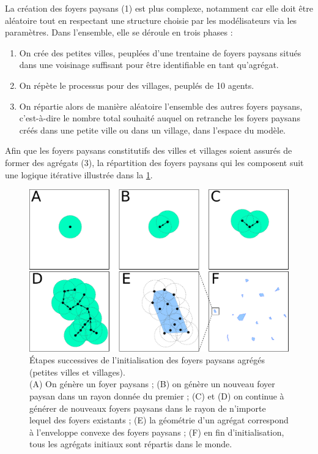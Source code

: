 La création des foyers paysans (1) est plus complexe, notamment car elle doit être aléatoire tout en respectant une structure choisie par les modélisateurs via les paramètres. Dans l'ensemble, elle se déroule en trois phases :
\begin{enumerate}
	\item On crée des \og petites villes\fg{}, peuplées d'une trentaine de foyers paysans situés dans une voisinage suffisant pour être identifiable en tant qu'agrégat.
	\item On répète le processus pour des \og villages\fg{}, peuplés de 10 agents.
	\item On répartie alors de manière aléatoire l'ensemble des autres foyers paysans, c'est-à-dire le nombre total souhaité auquel on retranche les foyers paysans créés dans une petite ville ou dans un village, dans l'espace du modèle.
\end{enumerate}
Afin que les foyers paysans constitutifs des villes et villages soient assurés de former des agrégats (3), la répartition des foyers paysans qui les composent suit une logique itérative illustrée dans la \cref{fig:init-fp}.

\begin{figure}[H]
	\centering
	\includegraphics[width=.98\linewidth]{img/init_fp.pdf}
	\caption{Étapes successives de l'initialisation des foyers paysans agrégés (petites villes et villages).\\
	(A) On génère un foyer paysans ; (B) on génère un nouveau foyer paysan dans un rayon donnée du premier ; (C) et (D) on continue à générer de nouveaux foyers paysans dans le rayon de n'importe lequel des foyers existants ; (E) la géométrie d'un agrégat correspond à l'enveloppe convexe des foyers paysans ; (F) en fin d'initialisation, tous les agrégats initiaux sont répartis dans le monde.}
	\label{fig:init-fp}
\end{figure}



